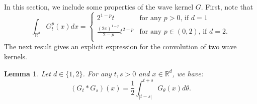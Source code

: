 \documentclass[12pt]{article}
\newtheorem{lemma}[theorem]{Lemma}
\def\bR{\mathbb{R}}
\begin{document}
In this section, we include some properties of the wave kernel $G$. First, note that
\begin{equation}
\label{int G p}
 \int_{\bR^d} G^p_t(x) dx = 
 \begin{cases} 
  2^{1-p}t & \mbox{for any $p >0$, if $d=1$} \\
  \frac{(2\pi)^{1-p}}{2-p}t^{2-p} & \mbox{for any $p\in (0, 2)$, if $d=2$}. \\
 \end{cases}
\end{equation}
The next result gives an explicit expression for the convolution of two wave kernels.
\begin{lemma}
\label{lemG*G}
Let $d\in \{1,2\}$. For any $t,s>0$ and $x\in \bR^d$, we have:
\begin{equation}
\label{G*G}
(G_t*G_s)(x)=\frac{1}{2}\int_{|t-s|}^{t+s} G_{\theta}(x) d\theta.
\end{equation}
\end{lemma}
\end{document}
